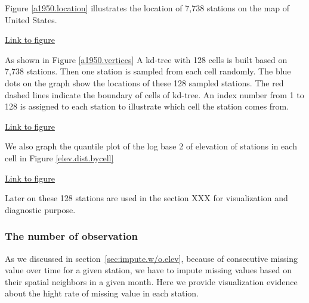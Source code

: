 Figure \href{../plots/a1950stations.pdf}{\ref*{a1950.location}} illustrates the 
location of 7,738 stations on the map of United States.

\begin{framed}
\begin{center}
  \href{../plots/a1950stations.pdf}{Link to figure}
  \label{a1950.location}
\end{center}
\end{framed}

As shown in Figure \href{../plots/vertices.a1950.pdf}{\ref*{a1950.vertices}}
A kd-tree with 128 cells is built based on 7,738 stations. Then one station is 
sampled from each cell randomly. The blue dots on the graph show the locations 
of these 128 sampled stations. The red dashed lines indicate the boundary of cells 
of kd-tree. An index number from 1 to 128 is assigned to each station to 
illustrate which cell the station comes from. 

\begin{framed}
\begin{center}
  \href{../plots/vertices.a1950.pdf}{Link to figure}
  \label{a1950.vertices}
\end{center}
\end{framed}

We also graph the quantile plot of the log base 2 of elevation of stations in each
cell in Figure \href{../plots/elev.dist.bycell.pdf}{\ref*{elev.dist.bycell}}

\begin{framed}
\begin{center}
  \href{../plots/elev.dist.bycell.pdf}{Link to figure}
  \label{elev.dist.bycell}
\end{center}
\end{framed}

Later on these 128 stations are used in the section XXX for visualization and 
diagnostic purpose.

\subsubsection{The number of observation}

As we discussed in section~\ref{sec:impute.w/o.elev}, because of consecutive 
missing value over time for a given station, we have to impute missing values 
based on their spatial neighbors in a given month. Here we provide visualization
evidence about the hight rate of missing value in each station.

